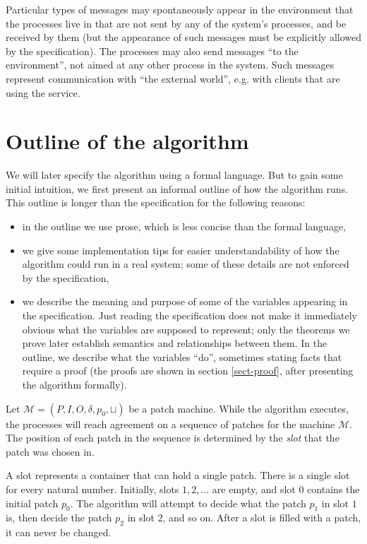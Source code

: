 \documentclass[12pt,a4paper,en]{pracamgr}
\newcommand{\ti}[1]{\textit{#1}}
\newcommand{\mc}[1]{\mathcal{#1}}
\begin{document}
Particular types of messages may spontaneously appear in the environment that the processes live in that are not sent by any of the system's processes, and be received by them (but the appearance of such messages must be explicitly allowed by the specification). The processes may also send messages ``to the environment'', not aimed at any other process in the system. Such messages represent communication with ``the external world'', e.g. with clients that are using the service.

\section{Outline of the algorithm}\label{outline}

We will later specify the algorithm using a formal language. But to gain some initial intuition, we first present an informal outline of how the algorithm runs. This outline is longer than the specification for the following reasons:
\begin{itemize}
    \item in the outline we use prose, which is less concise than the formal language,
    \item we give some implementation tips for easier understandability of how the algorithm could run in a real system; some of these details are not enforced by the specification,
    \item we describe the meaning and purpose of some of the variables appearing in the specification. Just reading the specification does not make it immediately obvious what the variables are supposed to represent; only the theorems we prove later establish semantics and relationships between them. In the outline, we describe what the variables ``do'', sometimes stating facts that require a proof (the proofs are shown in section \ref{sect-proof}, after presenting the algorithm formally).
\end{itemize}

Let $\mc M = (P, I, O, \delta, p_0, \sqcup)$ be a patch machine. While the algorithm executes, the processes will reach agreement on a sequence of patches for the machine $\mc M$. The position of each patch in the sequence is determined by the \ti{slot} that the patch was chosen in.

A slot represents a container that can hold a single patch. There is a single slot for every natural number. Initially, slots $1, 2, \dots$ are empty, and slot $0$ contains the initial patch $p_0$. The algorithm will attempt to decide what the patch $p_1$ in slot $1$ is, then decide the patch $p_2$ in slot $2$, and so on. After a slot is filled with a patch, it can never be changed.
\end{document}

